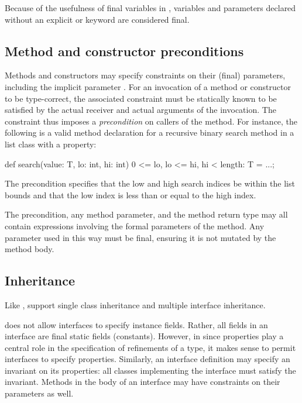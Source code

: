 Because of the usefulness of final variables in \Xten{}, variables
and parameters declared without an explicit  or 
keyword are considered final.

\subsection{Method and constructor preconditions}

Methods and constructors may specify constraints on their
(final) parameters, including the implicit parameter .
For an invocation of a method or constructor to
be type-correct, the associated constraint must be statically known
to be satisfied by the actual receiver and actual arguments of
the invocation.  The constraint thus imposes a \emph{precondition}
on callers of the method.
For instance, the following is a valid method declaration
for a recursive binary search method in a list class with a 
property:
\begin{xtennoindent}
  def search(value: T, lo: int, hi: int)
    {0 <= lo, lo <= hi, hi < length}: T = ...;
\end{xtennoindent}
The precondition
specifies that
the low and high search indices be within the list
bounds and that the low index is less than or equal to the high
index.

The precondition, any method parameter, and the method return
type may all 
contain expressions involving the
formal parameters of the method.  Any parameter used in this way must
be final,
ensuring it is not mutated by the method body.

\subsection{Inheritance}

Like \Java{},
\Xten{} support single class inheritance and multiple
interface inheritance.

\java{} does not allow interfaces to specify instance fields.  Rather, all
fields in an interface are final static fields (constants).
However, in \Xten{}
since properties play a central role in the specification of
refinements of a type, it makes sense to permit interfaces to specify
properties.
Similarly, an interface
definition may specify an invariant on its properties: all
classes implementing the interface must satisfy the invariant.  Methods
in the body of an interface may have constraints on their
parameters as well.

